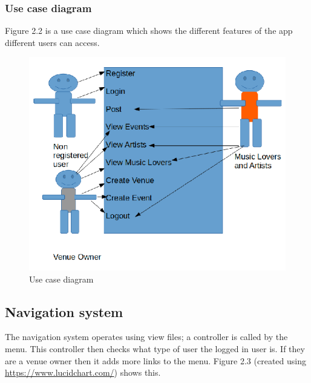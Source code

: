 \subsubsection{Use case diagram}
Figure 2.2 is a use case diagram which shows the different features of the app different users can access.
\begin{center} 
\begin{figure}[H]
\includegraphics[scale=0.45]{images/usecase}
\caption{Use case diagram}
\end{figure}
\end{center}

\subsection{Navigation system}
The navigation system operates using view files; a controller is called by the menu. This controller then checks what type of user the logged in user is. If they are a venue owner then it adds more links to the menu. Figure 2.3 (created using \url{https://www.lucidchart.com/}) shows this.

